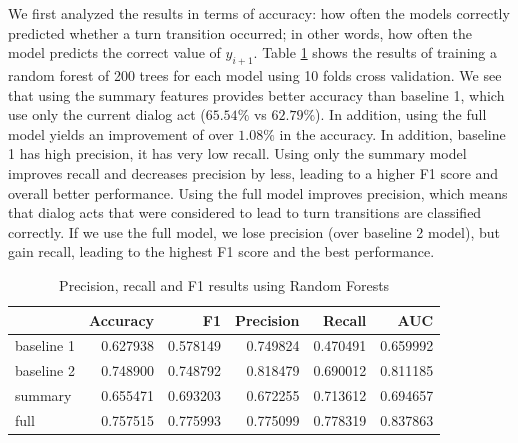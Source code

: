 We first analyzed the results in terms of accuracy: how often the models correctly predicted whether a turn transition occurred; in other words, how often the model predicts the correct value of $y_{i+1}$.
%
Table \ref{table:result} shows the results of training a random forest of 200 trees for each model using 10 folds cross validation. We see that using the summary features provides better accuracy than baseline 1, which use only the current dialog act ($65.54\%$ vs $62.79\%$). In addition, using the full model yields an improvement of over $1.08\%$ in the accuracy. In addition, baseline 1 has high precision, it has very low recall. Using only the summary model improves recall and decreases precision by less, leading to a higher F1 score and overall better performance. Using the full model improves precision, which means that dialog acts that were considered to lead to turn transitions are classified correctly. If we use the full model, we lose precision (over baseline 2 model), but gain recall,
leading to the highest F1 score and the best performance.
%
\begin{table}[ht!]
\begin{center}
\begin{tabular}{lrrrrr}
\toprule
{} &  Accuracy &        F1 &  Precision &    Recall &   AUC \\
\midrule
baseline 1 &  0.627938 &  0.578149 &   0.749824 &  0.470491 &  0.659992 \\
baseline 2 &  0.748900 &  0.748792 &   0.818479 &  0.690012 &  0.811185 \\
summary    &  0.655471 &  0.693203 &   0.672255 &  0.713612 &  0.694657 \\
full       &  0.757515 &  0.775993 &   0.775099 &  0.778319 &  0.837863 \\
\bottomrule
\end{tabular}
\end{center}
\caption{Precision, recall and F1 results using Random Forests }
\label{table:result}
\end{table}



